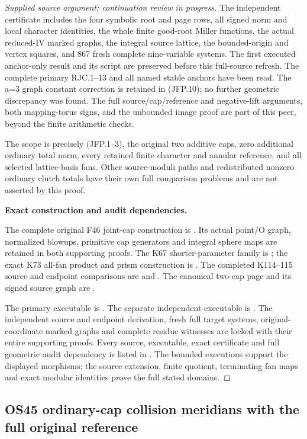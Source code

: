 \begin{proof}[Supplied source argument; continuation review in progress]
The independent certificate includes the four symbolic root
and page rows, all signed norm and local character identities,
the whole finite good-root Miller functions, the actual
reduced-IV marked graphs, the integral source lattice, the
bounded-origin and vertex squares, and 867 fresh complete
nine-variable systems. The first executed anchor-only result
and its script are preserved before this full-source refresh.
The complete primary RJC.1--13 and all named stable anchors
have been read. The a=3 graph constant correction is retained
in (JFP.10); no further geometric discrepancy was found.
The full source/cap/reference and negative-lift arguments,
both mapping-torus signs, and the unbounded image proof are
part of this peer, beyond the finite arithmetic checks.

The scope is precisely (JFP.1--3), the original two additive
caps, zero additional ordinary total norm, every retained
finite character and annular reference, and all selected
lattice-basis fans. Other source-moduli paths and redistributed
nonzero ordinary clutch totals have their own full comparison
problems and are not asserted by this proof.




\par\medskip\noindent\textbf{Exact construction and audit dependencies.}\par
The complete original F46 joint-cap construction is
.
Its actual point/O graph, normalized blowups, primitive cap generators
and integral sphere maps are retained in both supporting proofs.
The K67 shorter-parameter family is
;
the exact K73 all-fan product and prism construction is
.
The completed K114--115 source and endpoint comparisons are
 and
.
The canonical two-cap page and its signed source graph are
.

The primary executable is
.
The separate independent executable is
.
The independent source and endpoint derivation, fresh full target
systems, original-coordinate marked graphs and complete residue
witnesses are locked with their entire supporting proofs.
Every source, executable, exact certificate and full geometric audit
dependency is listed in
.
The bounded executions support the displayed morphisms; the source
extension, finite quotient, terminating fan maps and exact modular
identities prove the full stated domains.



\end{proof}


\subsection{OS45 ordinary-cap collision meridians with the full original reference}
